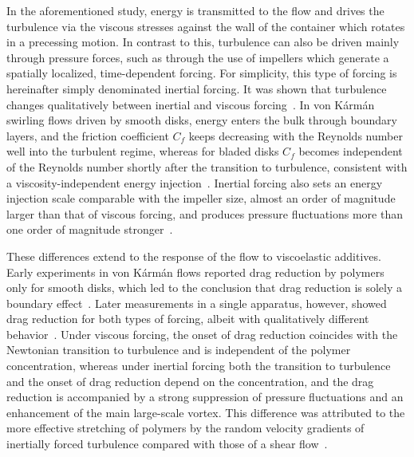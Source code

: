 \documentclass[aps,prfluids,groupedaddress,showkeys,11pt,tightenlines]{revtex4-2}
\begin{document}

In the aforementioned study, energy is transmitted to the flow and drives the turbulence via the viscous stresses against the wall of the container which rotates in a precessing motion. In contrast to this, turbulence can also be driven mainly through pressure forces, such as through the use of impellers which generate a spatially localized, time-dependent forcing. For simplicity, this type of forcing is hereinafter simply denominated inertial forcing. It was shown that turbulence changes qualitatively between inertial and viscous forcing~\cite{cadot1997energy,ravelet2008supercritical,burnishev2014torque}. In von K\'arm\'an swirling flows driven by smooth disks, energy enters the bulk through boundary layers, and the friction coefficient $C_f$ keeps decreasing with the Reynolds number well into the turbulent regime, whereas for bladed disks $C_f$ becomes independent of the Reynolds number shortly after the transition to turbulence, consistent with a viscosity-independent energy injection~\cite{cadot1997energy,ravelet2008supercritical,burnishev2014torque,mukherjee2018precise}. Inertial forcing also sets an energy injection scale comparable with the impeller size, almost an order of magnitude larger than that of viscous forcing, and produces pressure fluctuations more than one order of magnitude stronger~\cite{burnishev2014torque,burnishev2015turbulence}.

These differences extend to the response of the flow to viscoelastic additives. Early experiments in von K\'arm\'an flows reported drag reduction by polymers only for smooth disks, which led to the conclusion that drag reduction is solely a boundary effect~\cite{cadot1998turbulent}. Later measurements in a single apparatus, however, showed drag reduction for both types of forcing, albeit with qualitatively different behavior~\cite{burnishev2015turbulence}. Under viscous forcing, the onset of drag reduction coincides with the Newtonian transition to turbulence and is independent of the polymer concentration, whereas under inertial forcing both the transition to turbulence and the onset of drag reduction depend on the concentration, and the drag reduction is accompanied by a strong suppression of pressure fluctuations and an enhancement of the main large-scale vortex. This difference was attributed to the more effective stretching of polymers by the random velocity gradients of inertially forced turbulence compared with those of a shear flow~\cite{burnishev2015turbulence}. 
\end{document}
